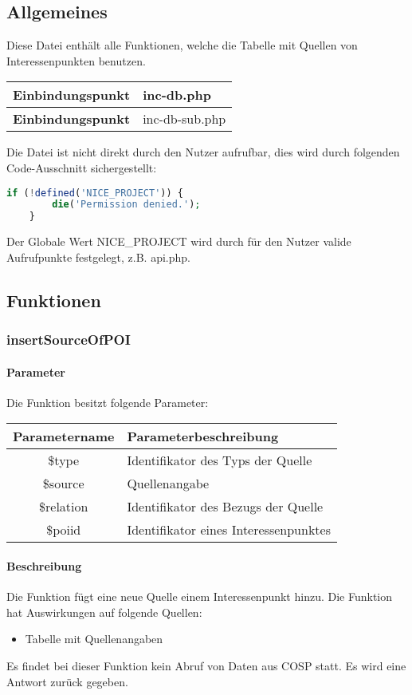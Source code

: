 \subsection{Allgemeines} Diese Datei enthält alle Funktionen, welche die Tabelle mit Quellen von Interessenpunkten benutzen.
\begin{table}[H]
	\begin{tabular}{|c|p{11cm}|}
		\hline
		\textbf{Einbindungspunkt} & inc-db.php \\ \hline
		\textbf{Einbindungspunkt} & inc-db-sub.php \\ \hline
	\end{tabular}
\end{table}
Die Datei ist nicht direkt durch den Nutzer aufrufbar, dies wird durch folgenden Code-Ausschnitt sichergestellt:
\begin{lstlisting}[language=php]
	if (!defined('NICE_PROJECT')) {
		die('Permission denied.');
	}
\end{lstlisting}
Der Globale Wert {\glqq NICE\_PROJECT\grqq} wird durch für den Nutzer valide Aufrufpunkte festgelegt, z.B. {\glqq api.php\grqq}.
\newpage
\subsection{Funktionen}
\subsubsection{insertSourceOfPOI}
\paragraph{Parameter} Die Funktion besitzt folgende Parameter:
\begin{table}[H]
	\begin{tabular}{|c|p{11cm}|}
		\hline
		\textbf{Parametername} & \textbf{Parameterbeschreibung} \\ \hline
		\$type     & Identifikator des Typs der Quelle \\ \hline
		\$source   & Quellenangabe \\ \hline
		\$relation & Identifikator des Bezugs der Quelle \\ \hline
		\$poiid    & Identifikator eines Interessenpunktes \\ \hline
	\end{tabular}
\end{table}
\paragraph{Beschreibung} Die Funktion fügt eine neue Quelle einem Interessenpunkt hinzu. Die Funktion hat Auswirkungen auf folgende Quellen:
\begin{itemize}
	\item Tabelle mit Quellenangaben
\end{itemize}
Es findet bei dieser Funktion kein Abruf von Daten aus {\glqq COSP\grqq} statt. Es wird eine Antwort zurück gegeben.
